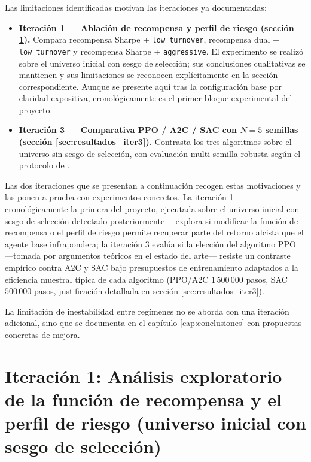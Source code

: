 \documentclass[IB,a4paper]{TFUOC}
\begin{document}
Las limitaciones identificadas motivan las iteraciones ya documentadas:

\begin{itemize}
    \item \textbf{Iteración 1 — Ablación de recompensa y perfil de riesgo (sección \ref{sec:resultados_iter2}).} Compara recompensa Sharpe + \texttt{low\_turnover}, recompensa dual + \texttt{low\_turnover} y recompensa Sharpe + \texttt{aggressive}. El experimento se realizó sobre el universo inicial con sesgo de selección; sus conclusiones cualitativas se mantienen y sus limitaciones se reconocen explícitamente en la sección correspondiente. Aunque se presente aquí tras la configuración base por claridad expositiva, cronológicamente es el primer bloque experimental del proyecto.
    \item \textbf{Iteración 3 — Comparativa PPO / A2C / SAC con $N=5$ semillas (sección \ref{sec:resultados_iter3}).} Contrasta los tres algoritmos sobre el universo sin sesgo de selección, con evaluación multi-semilla robusta según el protocolo de \citet{henderson2018deeprl}.
\end{itemize}

Las dos iteraciones que se presentan a continuación recogen estas motivaciones y las ponen a prueba con experimentos concretos. La iteración 1 ---cronológicamente la primera del proyecto, ejecutada sobre el universo inicial con sesgo de selección detectado posteriormente--- explora si modificar la función de recompensa o el perfil de riesgo permite recuperar parte del retorno alcista que el agente base infrapondera; la iteración 3 evalúa si la elección del algoritmo PPO —tomada por argumentos teóricos en el estado del arte— resiste un contraste empírico contra A2C y SAC bajo presupuestos de entrenamiento adaptados a la eficiencia muestral típica de cada algoritmo (PPO/A2C $1\,500\,000$ pasos, SAC $500\,000$ pasos, justificación detallada en sección \ref{sec:resultados_iter3}).

La limitación de inestabilidad entre regímenes no se aborda con una iteración adicional, sino que se documenta en el capítulo \ref{cap:conclusiones} con propuestas concretas de mejora.

\section{Iteración 1: Análisis exploratorio de la función de recompensa y el perfil de riesgo (universo inicial con sesgo de selección)}
\label{sec:resultados_iter2}
\end{document}
